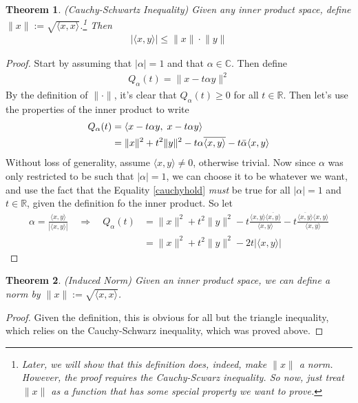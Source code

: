 \documentclass[12pt]{article}
\theoremstyle{plain}
\newtheorem{thm}{Theorem}[section]
\theoremstyle{definition}
\theoremstyle{remark}
\begin{document}
\begin{thm}
\label{thm.cauchyscwarz}
\emph{(Cauchy-Schwartz Inequality)}
Given any inner product space, define $\lVert x\rVert := \sqrt{\langle
x,x\rangle}$.\footnote{Later, we will show that this definition does,
indeed, make $\lVert x\rVert$ a norm.  However, the proof requires the
Cauchy-Scwarz inequality. So now, just treat $\lVert x\rVert$ as a
function that has some special property we want to prove.} Then
\begin{align*}
    \lvert \langle x,y\rangle\rvert \leq \lVert x\rVert\cdot\lVert y\rVert
\end{align*}
\end{thm}
\begin{proof}
Start by assuming that $|\alpha|=1$ and that $\alpha\in\mathbb{C}$. Then
define
\begin{align*}
    Q_\alpha(t) = \lVert x - t\alpha y\rVert^2
\end{align*}
By the definition of $\lVert \cdot\rVert$, it's clear that
$Q_\alpha(t)\geq 0$ for all $t\in\mathbb{R}$. Then let's use the
properties of the inner product to write
\begin{align}
  Q_\alpha(t) &= \langle x -t\alpha y,\; x -t\alpha y\rangle \notag \\
  &= \lVert x\rVert^2 + t^2 \lVert y\rVert^2
  - t\alpha \overline{\langle x,y\rangle}
  - t\bar{\alpha} {\langle x,y\rangle} \label{cauchyhold}
\end{align}
Without loss of generality, assume $\langle x,y\rangle\neq 0$, otherwise
trivial. Now since $\alpha$ was only restricted to be such that
$|\alpha|=1$, we can choose it to be whatever we want, and use the fact
that the Equality \ref{cauchyhold} \emph{must} be true for all
$|\alpha|=1$ and $t\in\mathbb{R}$, given the definition fo the inner
product. So let
\begin{align*}
  \alpha = \frac{\langle x,y\rangle}{|\langle x,y\rangle|}
  \quad\Rightarrow\quad
  Q_\alpha(t) &= \lVert x\rVert^2 + t^2 \lVert y\rVert^2
  - t\frac{\langle x,y\rangle\overline{\langle x,y\rangle}}{\langle x,y\rangle}
  - t\frac{\overline{\langle x,y\rangle}{\langle x,y\rangle}}{\langle x,y\rangle}  \\
  &= \lVert x\rVert^2 + t^2 \lVert y\rVert^2
  -2t |\langle x,y\rangle|
\end{align*}
\end{proof}

\begin{thm}\emph{(Induced Norm)}
\label{norminduce}
Given an inner product space, we can define a norm by $\lVert x\rVert :=
\sqrt{\langle x,x\rangle}$.
\end{thm}
\begin{proof}
Given the definition, this is obvious for all but the triangle
inequality, which relies on the Cauchy-Schwarz inequality, which was
proved above.
\end{proof}
\end{document}
